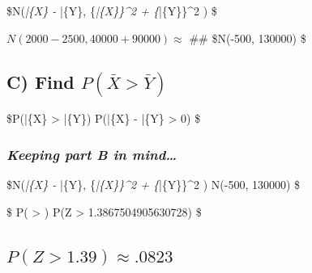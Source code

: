 \documentclass[11pt]{article}
\begin{document}
\$N(\mu\emph{\bar\{X\} - \mu}\bar\{Y\}, \{\sigma\emph{\bar\{X\}\}\^{}2 +
\{\sigma}\bar\{Y\}\}\^{}2 ) \approx \$

\(N(2000 - 2500, 40000 + 90000) \approx\) \#\# \$N(-500, 130000) \$

    \hypertarget{c-find-pbarx-bary}{%
\subsection{\texorpdfstring{C) Find
\(P(\bar{X} > \bar{Y})\)}{C) Find P(\textbackslash{}bar\{X\} \textgreater{} \textbackslash{}bar\{Y\})}}\label{c-find-pbarx-bary}}

\$P(\bar\{X\} \textgreater{} \bar\{Y\}) \approx P(\bar\{X\} - \bar\{Y\}
\textgreater{} 0) \approx \$

\hypertarget{keeping-part-b-in-mind}{%
\subsubsection{\texorpdfstring{\emph{Keeping part B in
mind\ldots{}}}{Keeping part B in mind\ldots{}}}\label{keeping-part-b-in-mind}}

\$N(\mu\emph{\bar\{X\} - \mu}\bar\{Y\}, \{\sigma\emph{\bar\{X\}\}\^{}2 +
\{\sigma}\bar\{Y\}\}\^{}2 ) \approx N(-500, 130000) \$

\$ P(  \textgreater{}
) \approx P(Z
\textgreater{} 1.3867504905630728) \approx \$

\hypertarget{pz-1.39-approx-.0823}{%
\subsection{\texorpdfstring{\(P(Z > 1.39) \approx .0823\)}{P(Z \textgreater{} 1.39) \textbackslash{}approx .0823}}\label{pz-1.39-approx-.0823}}
\end{document}
